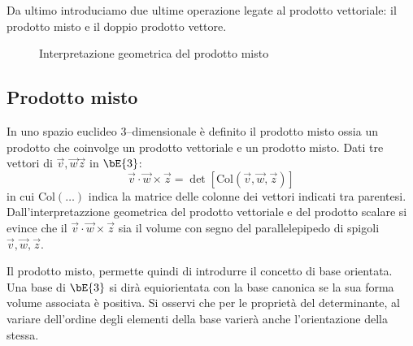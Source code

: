 Da ultimo introduciamo due ultime operazione legate al prodotto vettoriale: il 
prodotto misto
e il doppio prodotto vettore.

\begin{figure}[h!]
\begin{center}
{\small
{}
}
\caption{\small Interpretazione geometrica del prodotto misto}%
\end{center}
\end{figure}

\subsection*{Prodotto misto}
In uno spazio euclideo 3--dimensionale \`e definito il prodotto misto ossia un 
prodotto che
coinvolge un prodotto vettoriale e un prodotto misto. Dati tre vettori di $\vec 
v,\vec w\vec z$ 
in $\bE{3}$:
\[
  \vec v\cdot \vec w\times\vec z = \det[\textrm{Col}(\vec v,\vec w, \vec z)]
\]
in cui $\textrm{Col}(\ldots)$ indica la matrice delle colonne dei vettori 
indicati tra parentesi.
Dall'interpretazzione geometrica del prodotto vettoriale e del prodotto scalare 
si 
evince che il $\vec v\cdot \vec w\times\vec z$ sia il volume con segno del 
parallelepipedo di 
spigoli $\vec v,\vec w, \vec z$.

Il prodotto misto, permette quindi di introdurre il concetto di base orientata. 
Una base di 
$\bE{3}$ si dir\`a equiorientata con la base canonica se la sua forma volume 
associata 
\`e positiva. Si osservi che per le propriet\`a del determinante, al variare 
dell'ordine 
degli elementi della base varier\`a anche l'orientazione della stessa.


%



